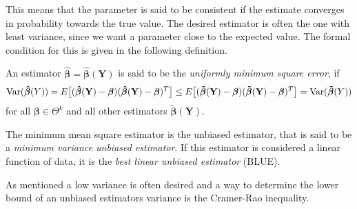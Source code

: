 This means that the parameter is said to be consistent if the estimate converges in probability towards the true value. 
The desired estimator is often the one with least variance, since we want a parameter close to the expected value. The formal condition for this is given in the following definition.

\begin{definition} 
\label{def:minimum_mean_square_error}
An estimator $\boldsymbol{\hat{\beta}}=\boldsymbol{\hat{\beta}}(\textbf{Y})$ is said to be the \textit{uniformly minimum square error}, if
\begin{align*}
    \operatorname{\text{Var}}(\boldsymbol{\hat{\beta}}(Y)) = E\big[ (\boldsymbol{\hat{\beta}}(\textbf{Y})-\boldsymbol{\beta})(\boldsymbol{\hat{\beta}}(\textbf{Y})-\boldsymbol{\beta})^T \big] \leq E\big[ (\boldsymbol{\tilde{\beta}}(\textbf{Y})-\boldsymbol{\beta})(\boldsymbol{\tilde{\beta}}(\textbf{Y})-\boldsymbol{\beta})^T \big] = \operatorname{\text{Var}}(\boldsymbol{\tilde{\beta}}(Y))
\end{align*} 
for all $\boldsymbol{\beta} \in \Theta^k $ and all other estimators $\boldsymbol{\tilde{\beta}(\textbf{Y})}$.
 \end{definition}
 
The minimum mean square estimator is the unbiased estimator, that is said to be a \textit{minimum variance unbiased estimator}. If this estimator is considered a linear function of data, it is the \textit{best linear unbiased estimator} (BLUE). 

As mentioned a low variance is often desired and a way to determine the lower bound of an unbiased estimators variance is the Cramer-Rao inequality.
 
